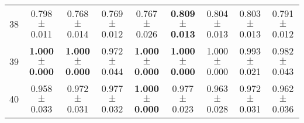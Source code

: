 \begin{table}[!ht]
{\begin{tabular}{r c c c c c c c c}
38 & 0.798 $\pm$ 0.011 & 0.768 $\pm$ 0.014 & 0.769 $\pm$ 0.012 & 0.767 $\pm$ 0.026 & \textbf{0.809 $\pm$ 0.013} & 0.804 $\pm$ 0.013 & 0.803 $\pm$ 0.013 & 0.791 $\pm$ 0.012 \\
39 & \textbf{1.000 $\pm$ 0.000} & \textbf{1.000 $\pm$ 0.000} & 0.972 $\pm$ 0.044 & \textbf{1.000 $\pm$ 0.000} & \textbf{1.000 $\pm$ 0.000} & 1.000 $\pm$ 0.000 & 0.993 $\pm$ 0.021 & 0.982 $\pm$ 0.043 \\
40 & 0.958 $\pm$ 0.033 & 0.972 $\pm$ 0.031 & 0.977 $\pm$ 0.032 & \textbf{1.000 $\pm$ 0.000} & 0.977 $\pm$ 0.023 & 0.963 $\pm$ 0.028 & 0.972 $\pm$ 0.031 & 0.962 $\pm$ 0.036 \\
\end{tabular}}
\end{table}
